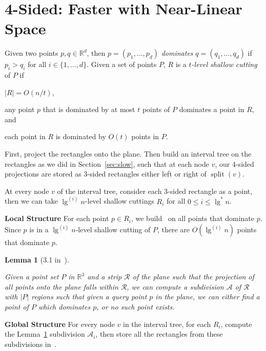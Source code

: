 \documentclass[letterpaper,12pt,twocolumn]{article}
\newcommand\lspace{\hspace{-0.5em}}
\DeclareMathOperator{\splt}{split}
\newcommand{\BigOh}[1]{O\!\left(#1\right)}
\newcommand\IR{\mathbb{R}}
\theoremstyle{plain}
\newtheorem{lemma}{Lemma}
\begin{document}
\section{\lspace{} 4-Sided: Faster with Near-Linear Space}
\label{sec:4sided}

Given two points $p,q \in \IR^d$, then $p = (p_1, \ldots, p_d)$
\emph{dominates} $q = (q_1, \ldots, q_d)$ if $p_i > q_i$ for all $i
\in \{1, \ldots, d \}$.  Given a set of points $P$, $R$ is a
\emph{$t$-level shallow cutting} of $P$ if
%
\begin{enumerate*}[label=(\roman*)] %
\item $|R| = \BigOh{n/t}$,
\item any point $p$ that is dominated by at most $t$ points of $P$
  dominates a point in $R$, and
\item each point in $R$ is dominated by $\BigOh{t}$ points in $P$.
\end{enumerate*}

First, project the rectangles onto the plane.  Then build an interval
tree on the rectangles as we did in Section~\ref{sec:slow}, such that
at each node $v$, our 4-sided projections are stored as 3-sided
rectangles either left or right of $\splt(v)$.

At every node $v$ of the interval tree, consider each 3-sided
rectangle as a point, then we can take $\lg^{(i)} n$-level shallow
cuttings $R_i$ for all $0 \le i \le \lg^* n$.

\textbf{Local Structure} For each point $p \in R_i$, we
build~\cite{afshani2008dominance} on all points that dominate $p$.
Since $p$ is in a $\lg^{(i)} n$-level shallow cutting of $P$, there
are $\BigOh{\lg^{(i)} n}$ points that dominate $p$.

\begin{lemma}[3.1 in~\cite{rahul2015improved}]\label{lem:31}

  Given a point set $P$ in $\IR^3$ and a strip $\mathcal{R}$ of the
  plane such that the projection of all points onto the plane falls
  within $\mathcal{R}$, we can compute a subdivision $\mathcal{A}$ of
  $\mathcal{R}$ with $|P|$ regions such that given a query point $p$
  in the plane, we can either find a point of $P$ which dominates $p$,
  or no such point exists.

\end{lemma}

\textbf{Global Structure} For every node $v$ in the interval tree, for
each $R_i$, compute the Lemma~\ref{lem:31} subdivision
$\mathcal{A}_i$, then store all the rectangles from these subdivisions
in~\cite{chazelle1986filtering}.
\end{document}
